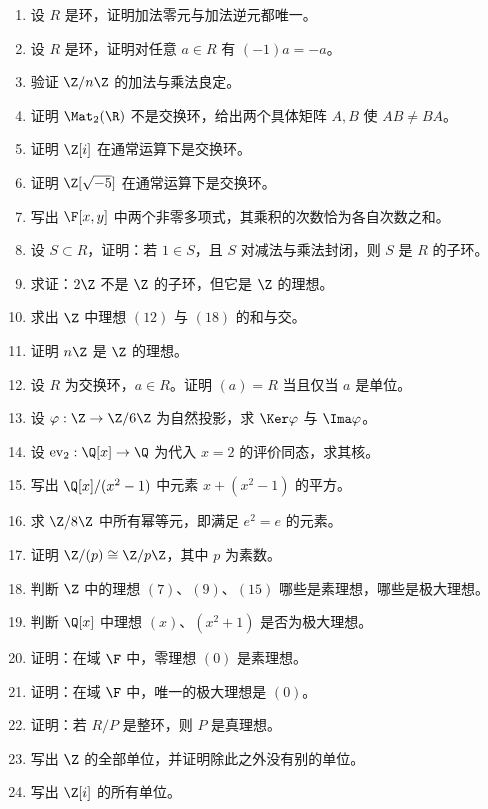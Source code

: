 \begin{enumerate}[label=\textbf{9.\arabic*}, leftmargin=*]
  \item \basic 设 $R$ 是环，证明加法零元与加法逆元都唯一。
  \item \basic 设 $R$ 是环，证明对任意 $a\in R$ 有 $(-1)a=-a$。
  \item \basic 验证 $\Z/n\Z$ 的加法与乘法良定。
  \item \basic 证明 $\Mat_2(\R)$ 不是交换环，给出两个具体矩阵 $A,B$ 使 $AB\neq BA$。
  \item \basic 证明 $\Z[i]$ 在通常运算下是交换环。
  \item \basic 证明 $\Z[\sqrt{-5}]$ 在通常运算下是交换环。
  \item \basic 写出 $\F[x,y]$ 中两个非零多项式，其乘积的次数恰为各自次数之和。
  \item \basic 设 $S\subset R$，证明：若 $1\in S$，且 $S$ 对减法与乘法封闭，则 $S$ 是 $R$ 的子环。
  \item \basic 求证：$2\Z$ 不是 $\Z$ 的子环，但它是 $\Z$ 的理想。
  \item \basic 求出 $\Z$ 中理想 $(12)$ 与 $(18)$ 的和与交。
  \item \basic 证明 $n\Z$ 是 $\Z$ 的理想。
  \item \basic 设 $R$ 为交换环，$a\in R$。证明 $(a)=R$ 当且仅当 $a$ 是单位。
  \item \basic 设 $\varphi:\Z\to \Z/6\Z$ 为自然投影，求 $\Ker\varphi$ 与 $\Ima\varphi$。
  \item \basic 设 $\operatorname{ev}_2:\Q[x]\to \Q$ 为代入 $x=2$ 的评价同态，求其核。
  \item \basic 写出 $\Q[x]/(x^2-1)$ 中元素 $x+(x^2-1)$ 的平方。
  \item \basic 求 $\Z/8\Z$ 中所有幂等元，即满足 $e^2=e$ 的元素。
  \item \basic 证明 $\Z/(p)\cong \Z/p\Z$，其中 $p$ 为素数。
  \item \basic 判断 $\Z$ 中的理想 $(7)$、$(9)$、$(15)$ 哪些是素理想，哪些是极大理想。
  \item \basic 判断 $\Q[x]$ 中理想 $(x)$、$(x^2+1)$ 是否为极大理想。
  \item \basic 证明：在域 $\F$ 中，零理想 $(0)$ 是素理想。
  \item \basic 证明：在域 $\F$ 中，唯一的极大理想是 $(0)$。
  \item \basic 证明：若 $R/P$ 是整环，则 $P$ 是真理想。
  \item \basic 写出 $\Z$ 的全部单位，并证明除此之外没有别的单位。
  \item \basic 写出 $\Z[i]$ 的所有单位。

\end{enumerate}
